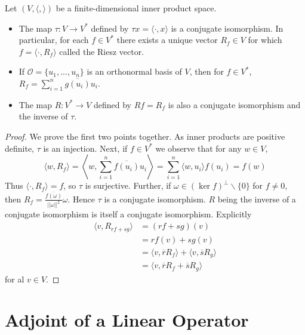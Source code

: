 \begin{theorem}
    Let $(V,\langle,\rangle)$ be a finite-dimensional inner product space. \begin{itemize}
        \item The map $\tau:V\rightarrow V^*$ defined by $\tau x = \langle\cdot,x\rangle$ is a conjugate isomorphism. In particular, for each $f \in V^*$ there exists a unique vector $R_f \in V$ for which $f = \langle \cdot,R_f\rangle$ called the Riesz vector.
        \item If $\mathcal{O} = \{u_1,...,u_n\}$ is an orthonormal basis of $V$, then for $f \in V^*$, $R_f = \sum_{i=1}^n\overline{g(u_i)}u_i$.
        \item The map $R:V^*\rightarrow V$ defined by $Rf = R_f$ is also a conjugate isomorphism and the inverse of $\tau$.
    \end{itemize}
\end{theorem}
\begin{proof}
    We prove the first two points together. As inner products are positive definite, $\tau$ is an injection. Next, if $f \in V^*$ we observe that for any $w \in V$, \begin{equation*}
        \langle w,R_f\rangle = \left\langle w,\sum_{i=1}^n\overline{f(u_i)}u_i\right\rangle = \sum_{i=1}^n\langle w,u_i\rangle f(u_i) = f(w)
    \end{equation*}
    Thus $\langle \cdot,R_f\rangle = f$, so $\tau$ is surjective. Further, if $\omega \in (\ker f)^{\perp}\backslash\{0\}$ for $f \neq 0$, then $R_f = \frac{\overline{f(\omega)}}{||\omega||^2}\omega$. Hence $\tau$ is a conjugate isomorphism. $R$ being the inverse of a conjugate isomorphism is itself a conjugate isomorphism. Explicitly \begin{align*}
        \langle v,R_{rf+sg}\rangle &= (rf+sg)(v) \\
        &= rf(v)+sg(v) \\
        &= \langle v,\overline{r}R_f\rangle + \langle v,\overline{s}R_g\rangle \\
        &= \langle v,\overline{r}R_f+\overline{s}R_g\rangle
    \end{align*}
    for al $v \in V$.
\end{proof}

\section{Adjoint of a Linear Operator}\label{sec:adjoint}

